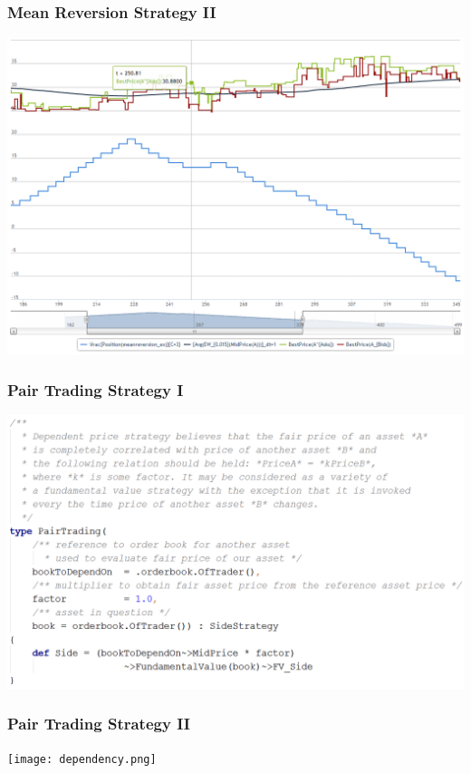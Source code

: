 \documentclass{beamer}
\begin{document}
\begin{frame}
\frametitle{Mean Reversion Strategy II}
\includegraphics[width=1\linewidth]{meanreversion.png}
\end{frame}
\begin{frame}
\frametitle{Pair Trading Strategy I}
\includegraphics[width=1\linewidth]{dependency_strategy.png}
\end{frame}
\begin{frame}
\frametitle{Pair Trading Strategy II}
\texttt{[image: dependency.png]}
\end{frame}
\end{document}
